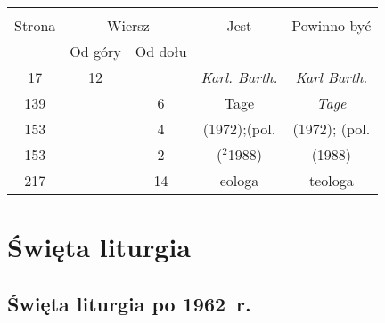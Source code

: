 \documentclass[a4paper,11pt]{article}
\begin{document}
\begin{center}

  \begin{tabular}{|c|c|c|c|c|}
    \hline
    & \multicolumn{2}{c|}{} & & \\
    Strona & \multicolumn{2}{c|}{Wiersz} & Jest
                              & Powinno być \\ \cline{2-3}
    & Od góry & Od dołu & & \\
    \hline
    17  & 12 & & \textit{Karl. Barth.} & \textit{Karl Barth.} \\
    139 & &  6 & Tage & \textit{Tage} \\
    153 & &  4 & (1972);(pol. & (1972); (pol. \\
    153 & &  2 & ($^{ 2 }$1988) & (1988) \\
    217 & & 14 & eologa & teologa \\
    \hline
  \end{tabular}

\end{center}











\newpage
\section{Święta liturgia}

\vspace{\spaceTwo}



\subsection{Święta liturgia po 1962~r.}

\vspace{\spaceThree}



\end{document}
